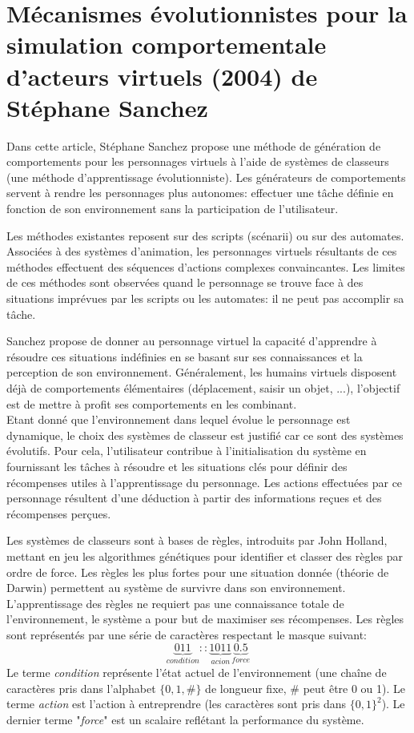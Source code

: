 \documentclass[11pt]{article}
\begin{document}
\section{Mécanismes évolutionnistes pour la simulation comportementale d'acteurs virtuels (2004) de Stéphane Sanchez}


Dans cette article, Stéphane Sanchez propose une méthode de génération de comportements pour les personnages virtuels à l'aide de systèmes de classeurs (une méthode d'apprentissage évolutionniste). Les générateurs de comportements servent à rendre les personnages plus autonomes: effectuer une tâche définie en fonction de son environnement sans la participation de l'utilisateur.

Les méthodes existantes reposent sur des scripts (scénarii) ou sur des automates. Associées à des systèmes d'animation, les personnages virtuels résultants de ces méthodes effectuent des séquences d'actions complexes convaincantes. Les limites de ces méthodes sont observées quand le personnage se trouve face à des situations imprévues par les scripts ou les automates: il ne peut pas accomplir sa tâche.

Sanchez propose de donner au personnage virtuel la capacité d'apprendre à résoudre ces situations indéfinies en se basant sur ses connaissances et la perception de son environnement. Généralement, les humains virtuels disposent déjà de comportements élémentaires (déplacement, saisir un objet, ...), l'objectif est de mettre à profit ses comportements en les combinant.\\
Etant donné que l'environnement dans lequel évolue le personnage est dynamique, le choix des systèmes de classeur est justifié car ce sont des systèmes évolutifs. Pour cela, l'utilisateur contribue à l'initialisation du système en fournissant les tâches à résoudre et les situations clés pour définir des récompenses utiles à l'apprentissage du personnage. Les actions effectuées par ce personnage résultent d'une déduction à partir des informations reçues et des récompenses perçues.

Les systèmes de classeurs sont à bases de règles, introduits par John Holland, mettant en jeu les algorithmes génétiques pour identifier et classer des règles par ordre de force. Les règles les plus fortes pour une situation donnée (théorie de Darwin) permettent au système de survivre dans son environnement. L'apprentissage des règles ne requiert pas une connaissance totale de l'environnement, le système a pour but de maximiser ses récompenses. Les règles sont représentés par une série de caractères respectant le masque suivant:
\[
\underbrace{011}_{condition}:: \underbrace{1011}_{acion} \underbrace{0.5}_{force}
\]
Le terme \textit{condition} représente l'état actuel de l'environnement (une chaîne de caractères pris dans l'alphabet $\{0,1,\#\}$ de longueur fixe, \# peut être 0 ou 1). Le terme \textit{action} est l'action à entreprendre (les caractères sont pris dans $ \{0, 1\}^2$). Le dernier terme "\textit{force}" est un scalaire reflétant la performance du système.
\end{document}
